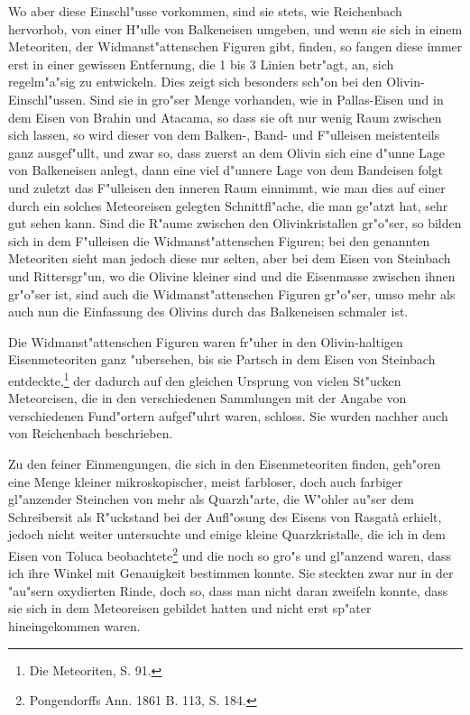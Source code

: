 \documentclass[a4paper, 11pt, oneside, german]{article}
\begin{document}
Wo aber diese Einschl"usse vorkommen, sind sie stets, wie Reichenbach hervorhob, von einer H"ulle von Balkeneisen umgeben, und wenn sie sich in einem Meteoriten, der Widmanst"attenschen Figuren gibt, finden, so fangen diese immer erst in einer gewissen Entfernung, die 1 bis 3 Linien betr"agt, an, sich regelm"a"sig zu entwickeln. Dies zeigt sich besonders sch"on bei den Olivin-Einschl"ussen. Sind sie in gro"ser Menge vorhanden, wie in Pallas-Eisen und in dem Eisen von Brahin und Atacama, so dass sie oft nur wenig Raum zwischen sich lassen, so wird dieser von dem Balken-, Band- und F"ulleisen meistenteils ganz ausgef"ullt, und zwar so, dass zuerst an dem Olivin sich eine d"unne Lage von Balkeneisen anlegt, dann eine viel d"unnere Lage von dem Bandeisen folgt und zuletzt das F"ulleisen den inneren Raum einnimmt, wie man dies auf einer durch ein solches Meteoreisen gelegten Schnittfl"ache, die man ge"atzt hat, sehr gut sehen kann. Sind die R"aume zwischen den Olivinkristallen gr"o"ser, so bilden sich in dem F"ulleisen die Widmanst"attenschen Figuren; bei den genannten Meteoriten sieht man jedoch diese nur selten, aber bei dem Eisen von Steinbach und Rittersgr"un, wo die Olivine kleiner sind und die Eisenmasse zwischen ihnen gr"o"ser ist, sind auch die Widmanst"attenschen Figuren gr"o"ser, umso mehr als auch nun die Einfassung des Olivins durch das Balkeneisen schmaler ist.

Die Widmanst"attenschen Figuren waren fr"uher in den Olivin-haltigen Eisenmeteoriten ganz "ubersehen, bis sie Partsch in dem Eisen von Steinbach entdeckte,\footnote{Die Meteoriten, S. 91.} der dadurch auf den gleichen Ursprung von vielen St"ucken Meteoreisen, die in den verschiedenen Sammlungen mit der Angabe von verschiedenen Fund"ortern aufgef"uhrt waren, schloss. Sie wurden nachher auch von Reichenbach beschrieben.

Zu den feiner Einmengungen, die sich in den Eisenmeteoriten finden, geh"oren eine Menge kleiner mikroskopischer, meist farbloser, doch auch farbiger gl"anzender Steinchen von mehr als Quarzh"arte, die W"ohler au"ser dem Schreibersit als R"uckstand bei der Aufl"osung des Eisens von Rasgatà erhielt, jedoch nicht weiter untersuchte und einige kleine Quarzkristalle, die ich in dem Eisen von Toluca beobachtete\footnote{Pongendorffs Ann. 1861 B. 113, S. 184.} und die noch so gro"s und gl"anzend waren, dass ich ihre Winkel mit Genauigkeit bestimmen konnte. Sie steckten zwar nur in der "au"sern oxydierten Rinde, doch so, dass man nicht daran zweifeln konnte, dass sie sich in dem Meteoreisen gebildet hatten und nicht erst sp"ater hineingekommen waren.
\end{document}
